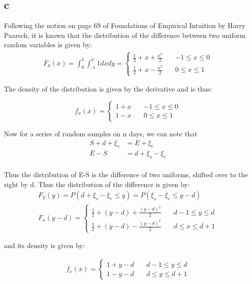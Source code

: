 \documentclass[11pt]{article}\usepackage[]{graphicx}\usepackage[]{color}
\begin{document}
\subsection{c}
\label{sec-1-3}
Following the notion on page 69 of Foundations of Empirical Intuition
by Harry Paarsch, it is known that the distribution of the difference
between two uniform random variables is given by:
\begin{align*}
  F_{\text{x}}(x) = \int_{\text{0}}^{\text{1}} \int_{\text{-1}}^{\text{x}} 1 dxdy = 
\begin{cases}
\frac{1}{2} + x + \frac{x^2}{2} \quad &-1 \leq x \leq 0 \\
\frac{1}{2} + x - \frac{x^2}{2} \quad &0 \leq x \leq 1
\end{cases}
\end{align*}

The density of the distribution is given by the derivative and is
thus:

$$f_x(x) = \begin{cases}
1 + x \quad &-1 \leq x \leq 0 \\
1 - x \quad &0 \leq x \leq 1
\end{cases}$$

Now for a series of random samples on n days, we can note that
\begin{align*}
S + d + \xi_s &= E + \xi_e \\
E - S &= d + \xi_s - \xi_e \\
\end{align*}

Thus the distribution of E-S is the difference of two uniforms,
shifted over to the right by d. Thus the distribution of the
difference is given by: 
\begin{align*}
F_Y(y) = P( d + \xi_s - \xi_e \leq y ) = P( \xi_s -\xi_e \leq y - d) \\
F_x( y - d ) = \begin{cases}
\frac{1}{2} + (y - d) + \frac{(y - d)^2}{2} \quad &d-1 \leq y \leq d \\
\frac{1}{2} + (y - d) - \frac{(y - d)^2}{2} \quad &d \leq x \leq d+1
\end{cases}
\end{align*}

and its density is given by:

\begin{align*}
f_x(x) = \begin{cases}
1 + y - d \quad &d-1 \leq y \leq d \\
1 - y - d \quad &d \leq y \leq d+1
\end{cases}
\end{align*}
\end{document}

